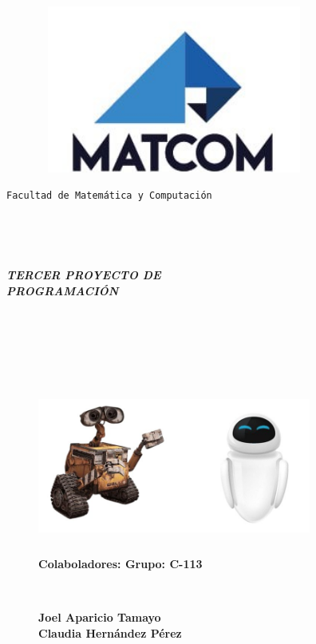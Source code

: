 \documentclass{article}
\begin{document}
\begin{figure}[t]
	\begin{center}
		\includegraphics[width=9cm, height=5.5cm]{Images/img0.jpg}
	\end{center}
\end{figure}

\begin{center}
    {\large\texttt{Facultad de Matemática y Computación}}
\end{center}


\ 


\


\begin{center}
   \textbf{\emph{\Huge{TERCER PROYECTO DE\\ PROGRAMACIÓN}}}
\end{center}


\ 


\ 


\


\begin{center}
	\begin{figure}[h]
		\begin{center}
			\includegraphics[width=9cm, height=5cm]{Images/presentacion.jpg}
		\end{center}
	\end{figure}

\end{center}

\begin{figure}[b]
	\begin{flushleft}
			\textbf{\LARGE{Colaboladores:}  \space\space\space\space\space\space \space\space
			\space\space\space\space  \space\space\space\space\space\space  
			\space\space\space\space\space\space  \LARGE{Grupo:} \Large{C-113}}
			

			\ 


			\textbf{\Large{Joel Aparicio Tamayo}} 
			\\ 
			\textbf{\Large{Claudia Hernández Pérez}}
	\end{flushleft}
\end{figure}
\end{document}
